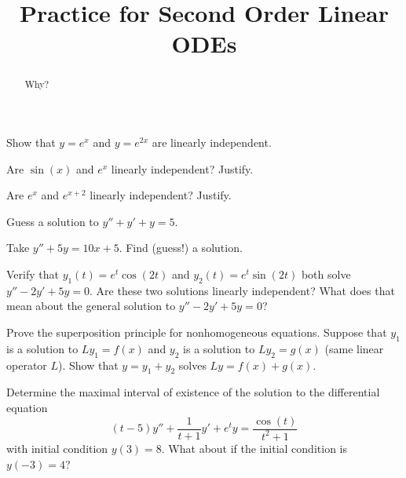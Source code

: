 \documentclass{ximera}
\title{Practice for Second Order Linear ODEs}
\begin{document}
\begin{abstract}
    Why?
\end{abstract}
\maketitle


\begin{exercise}
    Show that $y=e^x$ and $y=e^{2x}$ are linearly independent.
\end{exercise}

\begin{exercise}%
    Are $\sin(x)$ and $e^x$ linearly independent?  Justify.
\end{exercise}


\begin{exercise}%
    Are $e^x$ and $e^{x+2}$ linearly independent?  Justify.
\end{exercise}

\begin{exercise}%
    Guess a solution to $y'' + y' + y= 5$.
\end{exercise}

\begin{exercise}
    Take $y'' + 5 y = 10 x + 5$.  Find (guess!) a solution.
\end{exercise}

\begin{exercise}
    Verify that $y_1(t) = e^t \cos(2t)$ and $y_2(t) = e^t \sin(2t)$ both solve $y'' - 2y' + 5y = 0$. Are these two solutions linearly independent? What does that mean about the general solution to $y'' - 2y' + 5y = 0$?
\end{exercise}

\begin{exercise}
    Prove the superposition principle for nonhomogeneous equations.  Suppose that $y_1$ is a solution to $L y_1 = f(x)$ and $y_2$ is a solution to $L y_2 = g(x)$ (same linear operator $L$).  Show that $y = y_1+y_2$ solves $Ly = f(x) + g(x)$.
\end{exercise}

\begin{exercise}
    Determine the maximal interval of existence of the solution to the differential equation
    \[ 
        (t - 5)y'' + \frac{1}{t+1}y' + e^t y = \frac{\cos(t)}{t^2 + 1} 
    \] 
    with initial condition $y(3) = 8$. What about if the initial condition is $y(-3) = 4$?
\end{exercise}
\end{document}
